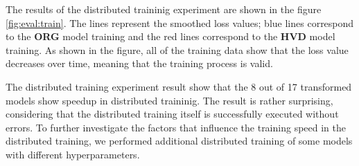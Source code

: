 The results of the distributed traininig experiment 
are shown in the figure \ref{fig:eval:train}.
The lines represent the smoothed loss values;
blue lines correspond to the \textbf{ORG} model training
and the red lines correspond to the \textbf{HVD} model training.
As shown in the figure, all of the training data show that
the loss value decreases over time, meaning that the training
process is valid.

The distributed training experiment result show that the 8 out of 17 transformed
models show speedup in distributed traininig. The result is rather surprising,
considering that the distributed training itself is successfully executed
without errors. To further investigate the factors that influence the
training speed in the distributed training, 
we performed additional distributed training of some models with
different hyperparameters.

